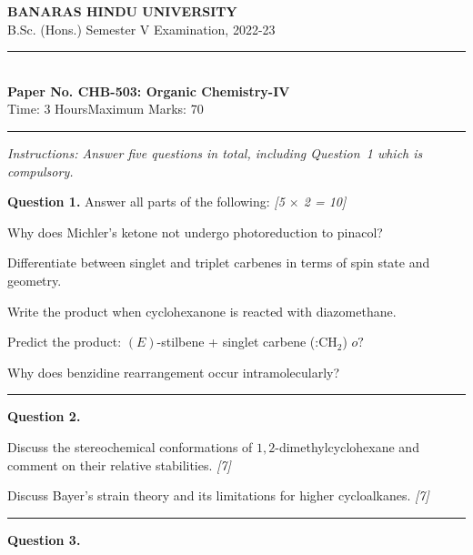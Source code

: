 \documentclass[11pt,a4paper]{article}
\newcommand{\pts}[1]{\hfill   \textit{[#1]}}
\begin{document}
\begin{center}
  {\large\bfseries BANARAS HINDU UNIVERSITY}\\[2pt]
  {\normalsize B.Sc. (Hons.) Semester V Examination, 2022-23}\\[6pt]
  \rule{0.8\linewidth}{0.5pt}\\[6pt]
  {\large\bfseries Paper No. CHB-503: Organic Chemistry-IV}\\[4pt]
  {\normalsize Time: 3 Hours\hfill Maximum Marks: 70}
\end{center}
\rule{\linewidth}{0.4pt}
\small



\noindent   \textit{Instructions: Answer five questions in total, including Question~1 which is compulsory.}

\normalsize
\bigskip




\noindent   \textbf{Question 1.} Answer all parts of the following: \pts{5 $ \times$ 2 = 10}

\begin{parts}
  \item Why does Michler's ketone not undergo photoreduction to pinacol?
  \item Differentiate between singlet and triplet carbenes in terms of spin state and geometry.
  \item Write the product when cyclohexanone is reacted with diazomethane.
  \item Predict the product: $(E)$-stilbene + singlet carbene ($ \text{:CH}_2$) $ o ?$
  \item Why does benzidine rearrangement occur intramolecularly?
\end{parts}

\medskip\rule{\linewidth}{0.2pt}




\noindent   \textbf{Question 2.}

\begin{parts}
  \item Discuss the stereochemical conformations of $1,2$-dimethylcyclohexane and comment on their relative stabilities. \pts{7}
  \item Discuss Bayer's strain theory and its limitations for higher cycloalkanes. \pts{7}
\end{parts}

\medskip\rule{\linewidth}{0.2pt}




\noindent   \textbf{Question 3.}
\end{document}
